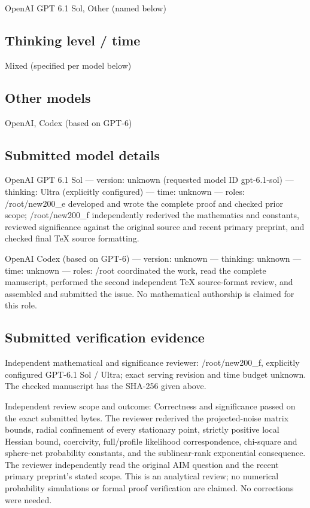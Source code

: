 \documentclass[11pt]{article}
\begin{document}
OpenAI GPT 6.1 Sol, Other (named below)

\subsection{Thinking level / time}

Mixed (specified per model below)

\subsection{Other models}

OpenAI, Codex (based on GPT-6)

\subsection{Submitted model details}

OpenAI GPT 6.1 Sol  —  version: unknown (requested model ID gpt-6.1-sol)  —  thinking: Ultra (explicitly configured)  —  time: unknown  —  roles: /root/new200\_e developed and wrote the complete proof and checked prior scope; /root/new200\_f independently rederived the mathematics and constants, reviewed significance against the original source and recent primary preprint, and checked final TeX source formatting.

OpenAI Codex (based on GPT-6)  —  version: unknown  —  thinking: unknown  —  time: unknown  —  roles: /root coordinated the work, read the complete manuscript, performed the second independent TeX source-format review, and assembled and submitted the issue. No mathematical authorship is claimed for this role.

\subsection{Submitted verification evidence}

Independent mathematical and significance reviewer: /root/new200\_f, explicitly configured GPT-6.1 Sol / Ultra; exact serving revision and time budget unknown. The checked manuscript has the SHA-256 given above.

Independent review scope and outcome: Correctness and significance passed on the exact submitted bytes. The reviewer rederived the projected-noise matrix bounds, radial confinement of every stationary point, strictly positive local Hessian bound, coercivity, full/profile likelihood correspondence, chi-square and sphere-net probability constants, and the sublinear-rank exponential consequence. The reviewer independently read the original AIM question and the recent primary preprint's stated scope. This is an analytical review; no numerical probability simulations or formal proof verification are claimed. No corrections were needed.
\end{document}
